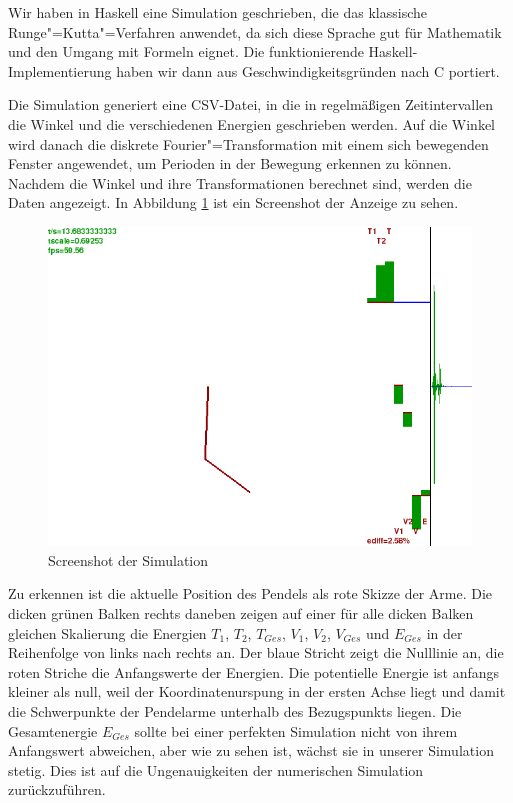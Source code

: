 Wir haben in Haskell eine Simulation geschrieben, die das klassische Runge"=Kutta"=Verfahren anwendet, da sich diese Sprache gut für Mathematik und den Umgang mit Formeln eignet. Die funktionierende Haskell-Implementierung haben wir dann aus Geschwindigkeitsgründen nach C portiert.

Die Simulation generiert eine CSV-Datei, in die in regelmäßigen Zeitintervallen die Winkel und die verschiedenen Energien geschrieben werden.
Auf die Winkel wird danach die diskrete Fourier"=Transformation mit einem sich bewegenden Fenster angewendet, um Perioden in der Bewegung erkennen zu können.
Nachdem die Winkel und ihre Transformationen berechnet sind, werden die Daten angezeigt.
In Abbildung \ref{fig:hssim} ist ein Screenshot der Anzeige zu sehen.

\begin{figure}[bht]
  \includegraphics[width=\textwidth]{images/haskell_simulation_fwindow1000_whitebg_cropped.png}
  \caption{Screenshot der Simulation}
  \label{fig:hssim}
\end{figure}

Zu erkennen ist die aktuelle Position des Pendels als rote Skizze der Arme.
Die dicken grünen Balken rechts daneben zeigen auf einer für alle dicken Balken gleichen Skalierung die Energien $T_1$, $T_2$, $T_{Ges}$, $V_1$, $V_2$, $V_{Ges}$ und $E_{Ges}$ in der Reihenfolge von links nach rechts an.
Der blaue Stricht zeigt die Nulllinie an, die roten Striche die Anfangswerte der Energien.
Die potentielle Energie ist anfangs kleiner als null, weil der Koordinatenurspung in der ersten Achse liegt und damit die Schwerpunkte der Pendelarme unterhalb des Bezugspunkts liegen.
Die Gesamtenergie $E_{Ges}$ sollte bei einer perfekten Simulation nicht von ihrem Anfangswert abweichen, aber wie zu sehen ist, wächst sie in unserer Simulation stetig.
Dies ist auf die Ungenauigkeiten der numerischen Simulation zurückzuführen.


